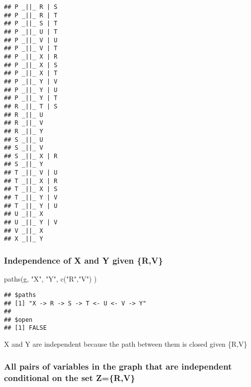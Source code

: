 \documentclass[
]{article}
\newenvironment{Shaded}{\begin{snugshade}}{\end{snugshade}}
\newcommand{\FunctionTok}[1]{\textcolor[rgb]{0.00,0.00,0.00}{#1}}
\newcommand{\NormalTok}[1]{#1}
\newcommand{\StringTok}[1]{\textcolor[rgb]{0.31,0.60,0.02}{#1}}
\begin{document}
\begin{verbatim}
## P _||_ R | S
## P _||_ R | T
## P _||_ S | T
## P _||_ U | T
## P _||_ V | U
## P _||_ V | T
## P _||_ X | R
## P _||_ X | S
## P _||_ X | T
## P _||_ Y | V
## P _||_ Y | U
## P _||_ Y | T
## R _||_ T | S
## R _||_ U
## R _||_ V
## R _||_ Y
## S _||_ U
## S _||_ V
## S _||_ X | R
## S _||_ Y
## T _||_ V | U
## T _||_ X | R
## T _||_ X | S
## T _||_ Y | V
## T _||_ Y | U
## U _||_ X
## U _||_ Y | V
## V _||_ X
## X _||_ Y
\end{verbatim}

\hypertarget{independence-of-x-and-y-given-rv}{%
\subsubsection{Independence of X and Y given
\{R,V\}}\label{independence-of-x-and-y-given-rv}}

\begin{Shaded}
\begin{Highlighting}[]
\FunctionTok{paths}\NormalTok{(g, }\StringTok{"X"}\NormalTok{, }\StringTok{"Y"}\NormalTok{, }\FunctionTok{c}\NormalTok{(}\StringTok{"R"}\NormalTok{,}\StringTok{"V"}\NormalTok{) ) }
\end{Highlighting}
\end{Shaded}

\begin{verbatim}
## $paths
## [1] "X -> R -> S -> T <- U <- V -> Y"
## 
## $open
## [1] FALSE
\end{verbatim}

X and Y are independent because the path between them is closed given
\{R,V\}

\hypertarget{all-pairs-of-variables-in-the-graph-that-are-independent-conditional-on-the-set-zrv}{%
\subsubsection{All pairs of variables in the graph that are independent
conditional on the set
Z=\{R,V\}}\label{all-pairs-of-variables-in-the-graph-that-are-independent-conditional-on-the-set-zrv}}
\end{document}

